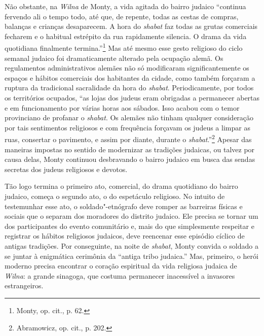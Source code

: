 Não obstante, na \textit{Wilna} de Monty, a vida agitada do bairro judaico
``continua fervendo ali o tempo todo, até que, de repente, todas as
cestas de compras, balanças e crianças desaparecem. A hora do \textit{shabat} faz
todas as grutas comerciais fecharem e o habitual estrépito da rua
rapidamente silencia. O drama da vida quotidiana finalmente
termina.''\footnote{Monty, op. cit., p. 62.} Mas até mesmo esse gesto
religioso do ciclo semanal judaico foi dramaticamente alterado pela
ocupação alemã. Os regulamentos administrativos alemães não só
modificaram significantemente os espaços e hábitos comerciais dos
habitantes da cidade, como também forçaram a ruptura da tradicional
sacralidade da hora do \textit{shabat}. Periodicamente, por todos os territórios
ocupados, ``as lojas dos judeus eram obrigadas a permanecer abertas e em
funcionamento por várias horas aos sábados. Isso acabou com o temor
provinciano de profanar o \textit{shabat}. Os alemães não tinham qualquer
consideração por tais sentimentos religiosos e com frequência forçavam
os judeus a limpar as ruas, consertar o pavimento, e assim por diante,
durante o \textit{shabat}.''\footnote{Abramowicz, op. cit., p. 202.} Apesar das
maneiras impostas no sentido de modernizar as tradições judaicas, ou
talvez por causa delas, Monty continuou desbravando o bairro judaico em
busca das sendas secretas dos judeus religiosos e devotos.

Tão logo termina o primeiro ato, comercial, do drama quotidiano do
bairro judaico, começa o segundo ato, o do espetáculo religioso. No
intuito de testemunhar esse ato, o soldado"-etnógrafo deve romper as
barreiras físicas e sociais que o separam dos moradores do distrito
judaico. Ele precisa se tornar um dos participantes do evento
comunitário e, mais do que simplesmente respeitar e registrar os hábitos
religiosos judaicos, deve reencenar esse episódio cíclico de antigas
tradições. Por conseguinte, na noite de \textit{shabat}, Monty convida o soldado
a se juntar à enigmática cerimônia da ``antiga tribo judaica.'' Mas,
primeiro, o herói moderno precisa encontrar o coração espiritual da vida
religiosa judaica de \textit{Wilna}: a grande sinagoga, que costuma permanecer
inacessível a invasores estrangeiros.


